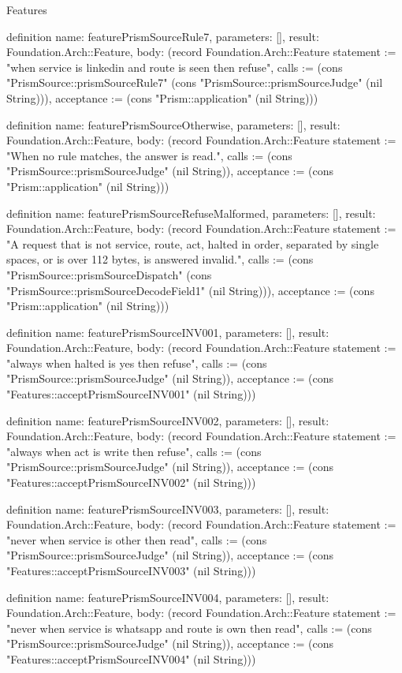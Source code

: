 \begin{lexlean}{Features}
\begin{semanticmodule}
definition{
  name: featurePrismSourceRule7,
  parameters: [],
  result: Foundation.Arch::Feature,
  body: (record Foundation.Arch::Feature {statement := "when service is linkedin and route is seen then refuse", calls := (cons "PrismSource::prismSourceRule7" (cons "PrismSource::prismSourceJudge" (nil String))), acceptance := (cons "Prism::application" (nil String))})
}

definition{
  name: featurePrismSourceOtherwise,
  parameters: [],
  result: Foundation.Arch::Feature,
  body: (record Foundation.Arch::Feature {statement := "When no rule matches, the answer is read.", calls := (cons "PrismSource::prismSourceJudge" (nil String)), acceptance := (cons "Prism::application" (nil String))})
}

definition{
  name: featurePrismSourceRefuseMalformed,
  parameters: [],
  result: Foundation.Arch::Feature,
  body: (record Foundation.Arch::Feature {statement := "A request that is not service, route, act, halted in order, separated by single spaces, or is over 112 bytes, is answered invalid.", calls := (cons "PrismSource::prismSourceDispatch" (cons "PrismSource::prismSourceDecodeField1" (nil String))), acceptance := (cons "Prism::application" (nil String))})
}

definition{
  name: featurePrismSourceINV001,
  parameters: [],
  result: Foundation.Arch::Feature,
  body: (record Foundation.Arch::Feature {statement := "always when halted is yes then refuse", calls := (cons "PrismSource::prismSourceJudge" (nil String)), acceptance := (cons "Features::acceptPrismSourceINV001" (nil String))})
}

definition{
  name: featurePrismSourceINV002,
  parameters: [],
  result: Foundation.Arch::Feature,
  body: (record Foundation.Arch::Feature {statement := "always when act is write then refuse", calls := (cons "PrismSource::prismSourceJudge" (nil String)), acceptance := (cons "Features::acceptPrismSourceINV002" (nil String))})
}

definition{
  name: featurePrismSourceINV003,
  parameters: [],
  result: Foundation.Arch::Feature,
  body: (record Foundation.Arch::Feature {statement := "never when service is other then read", calls := (cons "PrismSource::prismSourceJudge" (nil String)), acceptance := (cons "Features::acceptPrismSourceINV003" (nil String))})
}

definition{
  name: featurePrismSourceINV004,
  parameters: [],
  result: Foundation.Arch::Feature,
  body: (record Foundation.Arch::Feature {statement := "never when service is whatsapp and route is own then read", calls := (cons "PrismSource::prismSourceJudge" (nil String)), acceptance := (cons "Features::acceptPrismSourceINV004" (nil String))})
}


\end{semanticmodule}
\end{lexlean}
